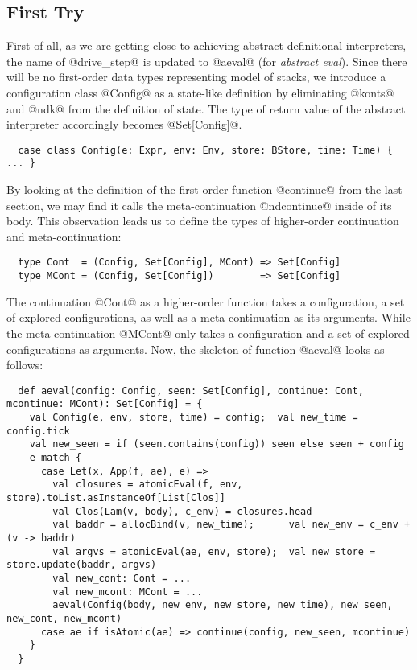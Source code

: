 \documentclass[acmsmall, review]{acmart}\settopmatter{}
\begin{document}
\subsection{First Try}

First of all, as we are getting close to achieving abstract definitional interpreters, 
the name of @drive_step@ is updated to @aeval@ (for \emph{abstract eval}).
Since there will be no first-order data types representing model of stacks,
we introduce a configuration class @Config@ as a state-like definition by eliminating
@konts@ and @ndk@ from the definition of state. The type of return value of the abstract
interpreter accordingly becomes @Set[Config]@.

\begin{lstlisting}
  case class Config(e: Expr, env: Env, store: BStore, time: Time) { ... }
\end{lstlisting}

By looking at the definition of the first-order function @continue@ from the last section,
we may find it calls the meta-continuation @ndcontinue@ inside of its body. 
This observation leads us to define the types of higher-order continuation and meta-continuation:

\begin{lstlisting}
  type Cont  = (Config, Set[Config], MCont) => Set[Config]
  type MCont = (Config, Set[Config])        => Set[Config]
\end{lstlisting}

The continuation @Cont@ as a higher-order function takes a configuration, a set of explored
configurations, as well as a meta-continuation as its arguments. While the meta-continuation
@MCont@ only takes a configuration and a set of explored configurations as arguments.
Now, the skeleton of function @aeval@ looks as follows:

\begin{lstlisting}
  def aeval(config: Config, seen: Set[Config], continue: Cont, mcontinue: MCont): Set[Config] = {
    val Config(e, env, store, time) = config;  val new_time = config.tick
    val new_seen = if (seen.contains(config)) seen else seen + config
    e match {
      case Let(x, App(f, ae), e) =>
        val closures = atomicEval(f, env, store).toList.asInstanceOf[List[Clos]]
        val Clos(Lam(v, body), c_env) = closures.head
        val baddr = allocBind(v, new_time);      val new_env = c_env + (v -> baddr)
        val argvs = atomicEval(ae, env, store);  val new_store = store.update(baddr, argvs)
        val new_cont: Cont = ...
        val new_mcont: MCont = ...
        aeval(Config(body, new_env, new_store, new_time), new_seen, new_cont, new_mcont)
      case ae if isAtomic(ae) => continue(config, new_seen, mcontinue)
    }
  }
\end{lstlisting}
\end{document}
